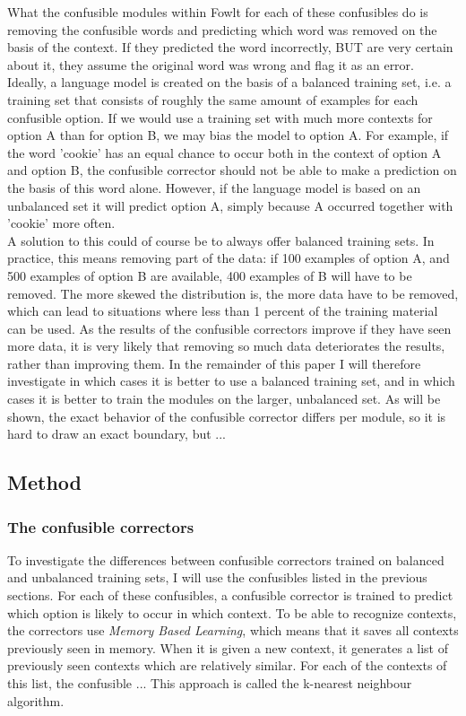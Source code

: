 \documentclass[12pt]{article}
\begin{document}
What the confusible modules within Fowlt for each of these confusibles do is removing the confusible words and predicting which word was removed on the basis of the context. If they predicted the word incorrectly, BUT are very certain about it, they assume the original word was wrong and flag it as an error. \\\indent
Ideally, a language model is created on the basis of a balanced training set, i.e. a training set that consists of roughly the same amount of examples for each confusible option. If we would use a training set with much more contexts for option A than for option B, we may bias the model to option A. For example, if the word 'cookie' has an equal chance to occur both in the context of option A and option B, the confusible corrector should not be able to make a prediction on the basis of this word alone. However, if the language model is based on an unbalanced set it will predict option A, simply because A occurred together with 'cookie' more often. \\\indent
A solution to this could of course be to always offer balanced training sets. In practice, this means removing part of the data: if 100 examples of option A, and 500 examples of option B are available, 400 examples of B will have to be removed. The more skewed the distribution is, the more data have to be removed, which can lead to situations where less than 1 percent of the training material can be used. As the results of the confusible correctors improve if they have seen more data, it is very likely that removing so much data deteriorates the results, rather than improving them. In the remainder of this paper I will therefore investigate in which cases it is better to use a balanced training set, and in which cases it is better to train the modules on the larger, unbalanced set. As will be shown, the exact behavior of the confusible corrector differs per module, so it is hard to draw an exact boundary, but ...


\subsection{Method}

\subsubsection{The confusible correctors}
To investigate the differences between confusible correctors trained on balanced and unbalanced training sets, I will use the confusibles listed in the previous sections. For each of these confusibles, a confusible corrector is trained to predict which option is likely to occur in which context. To be able to recognize contexts, the correctors use \emph{Memory Based Learning}, which means that it saves all contexts previously seen in memory. When it is given a new context, it generates a list of previously seen contexts which are relatively similar. For each of the contexts of this list, the confusible ... This approach is called the k-nearest neighbour algorithm.
\end{document}
